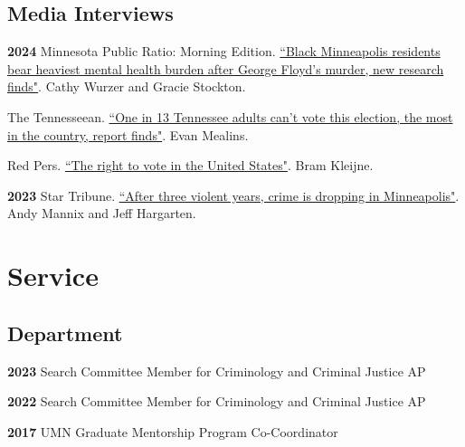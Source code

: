\documentclass[letterpaper]{article}
\newenvironment{publist}{%
  \begin{list}{}{%
    \setlength{\leftmargin}{0cm}   %
    \setlength{\labelwidth}{2cm}     %
    \setlength{\labelsep}{0.5cm}     %
  }%
}{%
  \end{list}%
}
\begin{document}
\subsection*{Media Interviews}
\begin{publist} 

\item[\textbf{2024}] Minnesota Public Ratio: Morning Edition. \href{https://www.mprnews.org/story/2024/09/19/black-minneapolis-residents-bear-heaviest-mental-health-burden-after-george-floyds-murder}{``Black Minneapolis residents bear heaviest mental health burden after George Floyd’s murder, new research finds"}. Cathy Wurzer and Gracie Stockton.  

\item The Tennesseean. \href{https://www.tennessean.com/story/news/2024/10/10/tn-has-highest-felony-disenfranchisement-rate-in-nation-report-finds/75597410007/}{``One in 13 Tennessee adults can't vote this election, the most in the country, report finds"}. Evan Mealins. 

\item Red Pers. \href{https://redpers.nl/}{``The right to vote in the United States"}. Bram Kleijne.

\item[\textbf{2023}] Star Tribune. \href{https://www.startribune.com/after-three-most-violent-years-minneapolis-saw-drop-in-crime-summer-but-were-not-back-to-normal-yet/600301635/}{``After three violent years, crime is dropping in Minneapolis"}. Andy Mannix and Jeff Hargarten.  

\end{publist}

\section*{\textbf{Service}}

\subsection*{Department}
\begin{publist}

\item[\textbf{2023}] Search Committee Member for Criminology and Criminal Justice AP
\item[\textbf{2022}] Search Committee Member for Criminology and Criminal Justice AP
\item[\textbf{2017}] UMN Graduate Mentorship Program Co-Coordinator

\end{publist}
\end{document}
